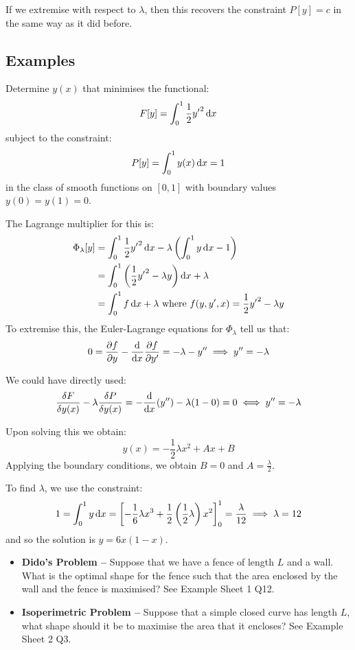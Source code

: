 \documentclass[../main.tex]{subfiles}
\begin{document}
If we extremise with respect to $\lambda$, then this recovers the constraint $P[y] = c$ in the same way as it did before.
\subsection{Examples}
Determine $y(x)$ that minimises the functional:
\[
  F[y] = \int_{0}^{1} \frac{1}{2} {y'}^2 \d{x}
\]
subject to the constraint:
\[
  P[y] = \int_{0}^{1} y(x) \d{x} = 1
\]
in the class of smooth functions on $[0, 1]$ with boundary values $y(0) = y(1) = 0$.

The Lagrange multiplier for this is:
\begin{align*}
  \Phi_{\lambda}[y] &= \int_{0}^{1} \frac{1}{2} {y'}^2 \d{x} - \lambda \left(\int_{0}^{1} y \d{x} - 1\right) \\
                    &= \int_{0}^{1} \left(\frac{1}{2} {y'}^2 - \lambda y\right) \d{x} + \lambda \\
                    &= \int_{0}^{1} f \d{x} + \lambda \text{ where } f(y, y', x) = \frac{1}{2} {y'}^2 - \lambda y
\end{align*}
To extremise this, the Euler-Lagrange equations for $\Phi_{\lambda}$ tell us that:
\[
  0 = \pderiv{f}{y} - \deriv{}{x} \pderiv{f}{y'} = - \lambda - y'' \implies y'' = - \lambda
\]
\begin{remark}[Note]
  We could have directly used:
  \[
    \frac{\delta F}{\delta y(x)} - \lambda \frac{\delta P}{\delta y(x)} = - \deriv{}{x}(y'') - \lambda(1 - 0) = 0 \iff y'' = -\lambda
  \]
\end{remark}
Upon solving this we obtain:
\[
  y(x) = - \frac{1}{2} \lambda x^2 + Ax + B
\]
Applying the boundary conditions, we obtain $B = 0$ and $A = \frac{\lambda}{2}$.

To find $\lambda$, we use the constraint:
\[
  1 = \int_{0}^{1} y \d{x} = \eval{-\frac{1}{6} \lambda x^3 + \frac{1}{2}\left(\frac{1}{2}\lambda\right)x^2}{0}{1} = \frac{\lambda}{12} \implies \lambda = 12
\]
and so the solution is $y = 6x(1 - x)$.
\begin{example}
  \begin{itemize}
    \item \textbf{Dido's Problem --} Suppose that we have a fence of length $L$ and a wall.
      What is the optimal shape for the fence such that the area enclosed by the wall and the fence is maximised?
      See Example Sheet 1 Q12.
    \item \textbf{Isoperimetric Problem --} Suppose that a simple closed curve has length $L$, what shape should it be to maximise the area that it encloses?
      See Example Sheet 2 Q3.
  \end{itemize}
\end{example}
\end{document}
